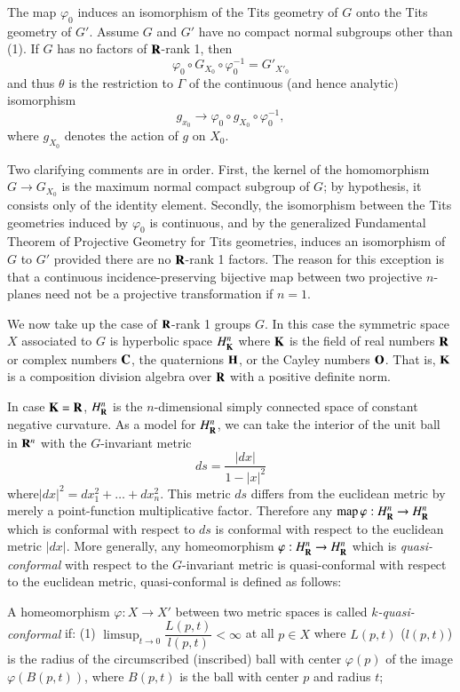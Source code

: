 \begin{theorem*}
The map $\varphi_0$ induces an isomorphism of the Tits geometry of $G$ onto the Tits geometry of $G'$. Assume $G$ and $G'$ have no compact normal subgroups other than (1). If $G$ has no factors of $\mathbf{R}$-rank 1, then
$$
\varphi_0 \circ G_{X_0} \circ \varphi^{-1}_0 = G'_{X'_0}
$$
and thus $\theta$ is the restriction to $\Gamma$ of the continuous (and hence analytic) isomorphism
$$
g_{x_0} \to \varphi_0 \circ g_{X_0} \circ \varphi^{-1}_0,
$$
where $g_{X_0}$ denotes the action of $g$ on $X_0$.
\end{theorem*}

Two clarifying comments are in order. First, the kernel of the homomorphism $G \to G_{X_0}$ is the maximum normal compact subgroup of $G$; by hypothesis, it consists only of the identity element. Secondly, the isomorphism between the Tits geometries induced by $\varphi_0$ is continuous, and by the generalized Fundamental Theorem of Projective Geometry for Tits geometries, induces an isomorphism of $G$ to $G'$ provided there are no $\mathbf{R}$-rank 1 factors. The reason for this exception is that a continuous incidence-preserving bijective map between two projective $n$-planes need not be a projective transformation if $n=1$.

We now take up the case of $\mathbf{R}$-rank 1 groups $G$. In this case the symmetric space $X$ associated to $G$ is hyperbolic space $H^n_{\mathbf{K}}$ where $\mathbf{K}$ is the field of real numbers $\mathbf{R}$ or complex numbers $\mathbf{C}$, the quaternions $\mathbf{H}$, or the Cayley numbers $\mathbf{O}$. That is, $\mathbf{K}$ is a composition division algebra over $\mathbf{R}$ with a positive definite norm.

In case $\mathbf{K} = \mathbf{R}$, $H^n_{\mathbf{R}}$ is the $n$-dimensional simply connected space of constant negative curvature. As a model for $H^n_{\mathbf{R}}$, we can take the interior of the unit ball in $\mathbf{R}^n$ with the $G$-invariant metric 
$$
ds = \frac{|dx|}{1- |x|^2}
$$
where\pageoriginale $|dx|^2 = dx^2_1 + \ldots + dx^2_n$. This metric  $ds$ differs from the euclidean metric by merely a point-function multiplicative factor. Therefore any $\operatorname{map}  \varphi: H^n_{\mathbf{R}} \to H^n_{\mathbf{R}}$ which is conformal with respect to $ds$ is conformal with respect to the euclidean metric $|dx|$. More generally, any homeomorphism $\varphi : H^n_{\mathbf{R}} \to H^n_{\mathbf{R}}$ which is \textit{quasi-conformal} with respect to the $G$-invariant metric is quasi-conformal with respect to the euclidean metric, quasi-conformal is defined as follows:

A homeomorphism $\varphi : X \to X'$ between two metric spaces is called \textit{$k$-quasi-conformal} if: (1) ${\displaystyle{\mathop{\lim\sup}_{t \to 0}}} \dfrac{L(p,t)}{l(p,t)} < \infty$ at all $p\in X$ where $L(p,t)$ (\resp $l(p,t)$) is the radius of the circumscribed (\resp inscribed) ball with center $\varphi(p)$ of the image $\varphi (B (p,t))$, where $B(p,t)$ is the ball with center $p$ and radius $t$;

